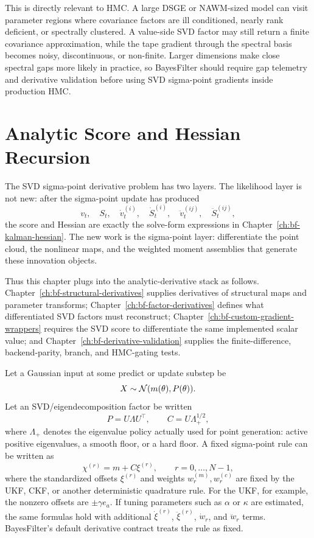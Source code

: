 This is directly relevant to HMC.  A large DSGE or NAWM-sized model can visit
parameter regions where covariance factors are ill conditioned, nearly rank
deficient, or spectrally clustered.  A value-side SVD factor may still return a
finite covariance approximation, while the tape gradient through the spectral
basis becomes noisy, discontinuous, or non-finite.  Larger dimensions make
close spectral gaps more likely in practice, so BayesFilter should require
gap telemetry and derivative validation before using SVD sigma-point gradients
inside production HMC.

\section{Analytic Score and Hessian Recursion}
\label{sec:bf-svd-sp-analytic-recursion}

The SVD sigma-point derivative problem has two layers.  The likelihood layer is
not new: after the sigma-point update has produced
\[
  v_t,\quad S_t,\quad
  \dot v_t^{(i)},\quad \dot S_t^{(i)},\quad
  \ddot v_t^{(ij)},\quad \ddot S_t^{(ij)},
\]
the score and Hessian are exactly the solve-form expressions in
Chapter~\ref{ch:bf-kalman-hessian}.  The new work is the sigma-point layer:
differentiate the point cloud, the nonlinear maps, and the weighted moment
assemblies that generate these innovation objects.

Thus this chapter plugs into the analytic-derivative stack as follows.
Chapter~\ref{ch:bf-structural-derivatives} supplies derivatives of structural
maps and parameter transforms; Chapter~\ref{ch:bf-factor-derivatives} defines
what differentiated SVD factors must reconstruct; Chapter~\ref{ch:bf-custom-gradient-wrappers}
requires the SVD score to differentiate the same implemented scalar value; and
Chapter~\ref{ch:bf-derivative-validation} supplies the finite-difference,
backend-parity, branch, and HMC-gating tests.

Let a Gaussian input at some predict or update substep be
\[
  X\sim\mathcal{N}(m(\theta),P(\theta)).
\]
Let an SVD/eigendecomposition factor be written
\[
  P=U\Lambda U^\top,\qquad
  C=U\Lambda_+^{1/2},
\]
where $\Lambda_+$ denotes the eigenvalue policy actually used for point
generation: active positive eigenvalues, a smooth floor, or a hard floor.  A
fixed sigma-point rule can be written as
\begin{equation}
\label{eq:bf-svd-sp-cloud}
  \chi^{(r)} = m + C\xi^{(r)},\qquad r=0,\ldots,N-1,
\end{equation}
where the standardized offsets $\xi^{(r)}$ and weights
$w_r^{(m)},w_r^{(c)}$ are fixed by the UKF, CKF, or another deterministic
quadrature rule.  For the UKF, for example, the nonzero offsets are
$\pm\gamma e_a$.  If tuning parameters such as $\alpha$ or $\kappa$ are
estimated, the same formulas hold with additional $\dot\xi^{(r)}$,
$\ddot\xi^{(r)}$, $\dot w_r$, and $\ddot w_r$ terms.  BayesFilter's default
derivative contract treats the rule as fixed.

